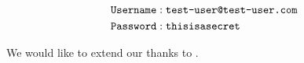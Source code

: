 \vspace{-2em}

\begin{align*} 
\text{\texttt{Username}} &: \text{\texttt{test-user@test-user.com}} \\ 
\text{\texttt{Password}} &: \text{\texttt{thisisasecret}}
\end{align*}

We would like to extend our thanks to .







